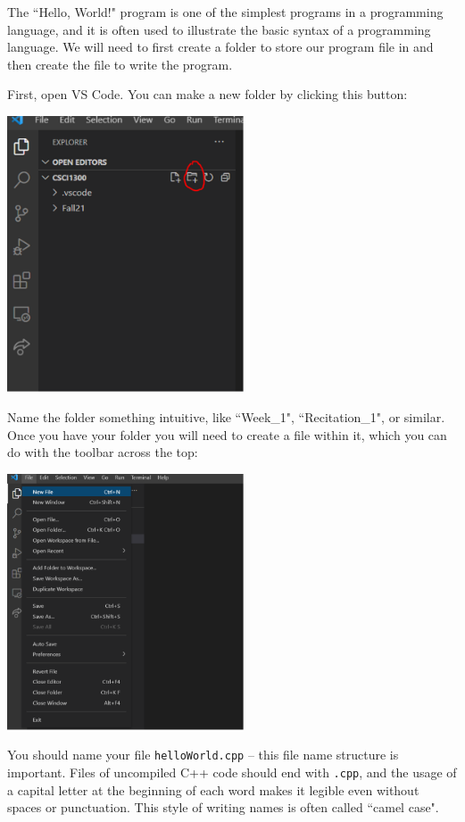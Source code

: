 The ``Hello, World!" program is one of the simplest programs in a programming language, and it is often used to illustrate the basic syntax of a programming language. We will need to first create a folder to store our program file in and then create the file to write the program.

First, open VS Code. You can make a new folder by clicking this button: 

\includegraphics[width=7cm]{images/hello_world_2.png}

Name the folder something intuitive, like ``Week\_1", ``Recitation\_1", or similar. Once you have your folder you will need to create a file within it, which you can do with the toolbar across the top:

\includegraphics[width=7cm]{images/hello_world_4.png}

You should name your file \texttt{helloWorld.cpp} -- this file name structure is important. Files of uncompiled C++ code should end with \texttt{.cpp}, and the usage of a capital letter at the beginning of each word makes it legible even without spaces or punctuation. This style of writing names is often called ``camel case". 

